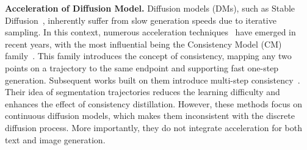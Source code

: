 \noindent \textbf{Acceleration of Diffusion Model.}
Diffusion models (DMs), such as Stable Diffusion~\cite{rombach2022high,podellsdxl}, inherently suffer from slow generation speeds due to iterative sampling. 
In this context, numerous acceleration techniques~\cite{salimans2022progressive,liu2023instaflow,sauer2025adversarial,ren2024hyper,chadebec2024flash,yin2024one} have emerged in recent years, 
with the most influential being the Consistency Model (CM) family~\cite{song2023consistency,luo2023latent}.
This family introduces the concept of consistency, mapping any two points on a trajectory to the same endpoint and supporting fast one-step generation. Subsequent works built on them introduce multi-step consistency~\cite{zheng2024trajectory,heek2024multistep,xie2024mlcm,wang2024phased}.
Their idea of segmentation trajectories reduces the learning difficulty and enhances the effect of consistency distillation. 
However, these methods focus on continuous diffusion models, which makes them inconsistent with the discrete diffusion process. 
More importantly, they do not integrate acceleration for both text and image generation.
